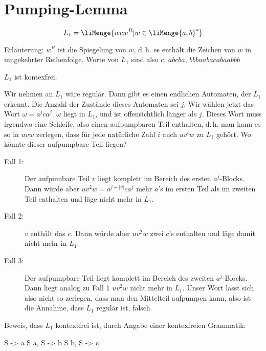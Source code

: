 \documentclass{lehramt-informatik-aufgabe}
\begin{document}
\section{Pumping-Lemma
}


\begin{displaymath}
L_1 = \liMenge{ w c w^R | w \in \liMenge{a, b}^* }
\end{displaymath}

\noindent
Erläuterung: $w^R$ ist die Spiegelung von $w$, d.\,h. es enthält die
Zeichen von $w$ in umgekehrter Reihenfolge. Worte von $L_1$ sind also
\zB $c$, $abcba$, $bbbaabacabaabbb$

\begin{liAntwort}
$L_1$ ist kontexfrei.


\noindent
Wir nehmen an $L_1$ wäre regulär. Dann gibt es einen endlichen
Automaten, der $L_1$ erkennt. Die Anzahl der Zustände dieses Automaten
sei $j$. Wir wählen jetzt das Wort $\omega = a^j c a^j$. $\omega$ liegt
in $L_1$, und ist offensichtlich länger als $j$. Dieses Wort muss
irgendwo eine Schleife, also einen aufpumpbaren Teil enthalten, d.\,h.
man kann es so in $uvw$ zerlegen, dass für jede natürliche Zahl $i$ auch
$uv^iw$ zu $L_1$ gehört. Wo könnte dieser aufpumpbare Teil liegen?

\begin{description}
\item[Fall 1:]

Der aufpumbare Teil $v$ liegt komplett im Bereich des ersten
$a^j$-Blocks. Dann würde aber $uv^2w = a^{j + |v|} c a^j$ mehr $a$’s im
ersten Teil als im zweiten Teil enthalten und läge nicht mehr in $L_1$.

\item[Fall 2:]

$v$ enthält das $c$. Dann würde aber $u v^2 w$ zwei $c$’s enthalten und
läge damit nicht mehr in $L_1$.

\item[Fall 3:]

Der aufpumpbare Teil liegt komplett im Bereich des zweiten $a^j$-Blocks.
Dann liegt analog zu Fall 1 $u v^2 w$ nicht mehr in $L_1$. Unser Wort
lässt sich also nicht so zerlegen, dass man den Mittelteil aufpumpen
kann, also ist die Annahme, dass $L_1$ regulär ist, falsch.
\end{description}
\noindent
Beweis, dass $L_1$ kontextfrei ist, durch Angabe einer kontexfreien
Grammatik:

\noindent
\begin{liProduktionsRegeln}
S -> a S a,
S -> b S b,
S -> c
\end{liProduktionsRegeln}
\end{liAntwort}
\end{document}
